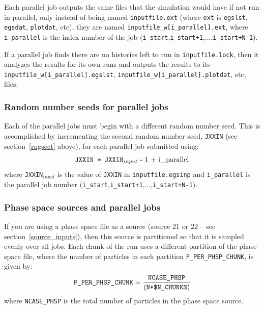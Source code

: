 \documentclass[12pt,twoside]{article}  %
\begin{document}
Each parallel job outputs the same files that the simulation would
have if not run in parallel, only instead of being named
{\tt inputfile.ext} (where {\tt ext} is {\tt egslst}, {\tt egsdat},
{\tt plotdat}, etc), they are named {\tt inputfile\_w[i\_parallel].ext},
where {\tt i\_parallel} is the index number of the job
({\tt i\_start},{\tt i\_start+1},...,{\tt i\_start+N-1}).

If a parallel job finds there are no histories left to run in
{\tt inputfile.lock}, then it analyzes the results for its own runs
and outputs the results to its {\tt inputfile\_w[i\_parallel].egslst},
{\tt inputfile\_w[i\_parallel].plotdat}, etc, files. 

\subsubsection{Random number seeds for parallel jobs}
Each of the parallel jobs must begin with a different random
number seed.  This is accomplished by incrementing the second
random number seed, {\tt JXXIN} (see section~\ref{rngsect} above),
for each parallel job submitted using:
\begin{equation}
\mbox{\tt JXXIN = JXXIN}_{input} \mbox{ - 1 + i\_parallel}
\end{equation}
where {\tt JXXIN$_{input}$} is the value of {\tt JXXIN} in {\tt inputfile.egsinp}
and {\tt i\_parallel} is the parallel job number 
({\tt i\_start},{\tt i\_start+1},...,{\tt i\_start+N-1}).

\subsubsection{Phase space sources and parallel jobs}
If you are using a phase space file
as a source (source 21 or 22 -- see section~\ref{source_inputs}), 
then this source is partitioned so that it is sampled
evenly over all jobs.  Each chunk of the run uses a different partition
of the phase space file, where the number of particles in each
partition
{\tt P\_PER\_PHSP\_CHUNK}, is given by:
\begin{equation}
\mbox{\tt P\_PER\_PHSP\_CHUNK} = \frac{\mbox{\tt NCASE\_PHSP}}{\left(\mbox{\tt
N*\$N\_CHUNKS}\right)}
\end{equation}
where {\tt NCASE\_PHSP} is the total number of particles in the phase
space source.
\end{document}
